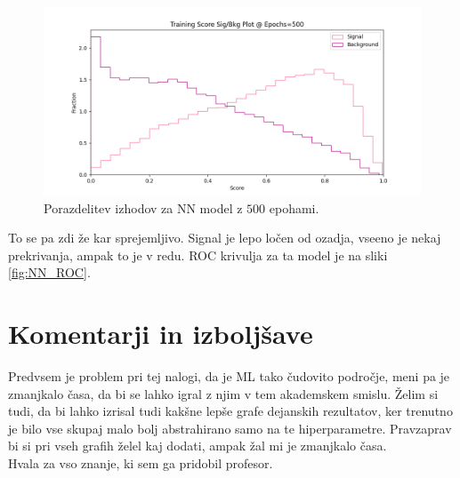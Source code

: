 \documentclass[a4paper]{article}
\begin{document}
\begin{figure}[H]
    \centering
    \includegraphics[width=1\textwidth]{../images/NNsig_bk_500.png}
    \caption{Porazdelitev izhodov za NN model z $500$ epohami.}
    \label{fig:NN_500}
\end{figure}

To se pa zdi že kar sprejemljivo. Signal je lepo ločen od ozadja, vseeno je nekaj prekrivanja, ampak to je v redu.
ROC krivulja za ta model je na sliki \ref{fig:NN_ROC}. \\


\section{Komentarji in izboljšave}
Predvsem je problem pri tej nalogi, da je ML tako čudovito področje, meni pa je zmanjkalo časa, da bi se lahko
igral z njim v tem akademskem smislu. Želim si tudi, da bi lahko izrisal tudi kakšne lepše grafe dejanskih
rezultatov, ker trenutno je bilo vse skupaj malo bolj abstrahirano samo na te hiperparametre. Pravzaprav 
bi si pri vseh grafih želel kaj dodati, ampak žal mi je zmanjkalo časa. \\

Hvala za vso znanje, ki sem ga pridobil profesor. 

\newpage


\end{document}
